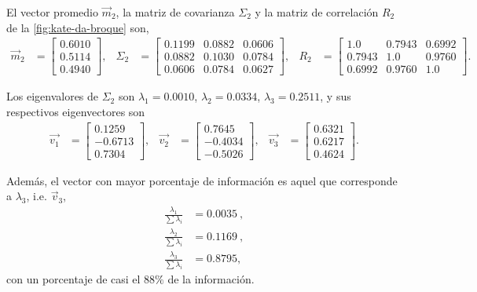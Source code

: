 El vector promedio $\vec{m}_2$, la matriz de covarianza $\Sigma_2$ y la matriz de correlación $R_2$ de la \cref{fig:kate-da-broque} son,
\begin{align*}
    \vec{m}_2 & =
    \begin{bmatrix}
        0.6010 \\
        0.5114 \\
        0.4940
    \end{bmatrix}, &
    \Sigma_2 & =
    \begin{bmatrix}
        0.1199 & 0.0882 & 0.0606 \\
        0.0882 & 0.1030 & 0.0784 \\
        0.0606 & 0.0784 & 0.0627
    \end{bmatrix}, &
    R_2 & = 
    \begin{bmatrix}
        1.0    & 0.7943 & 0.6992 \\
        0.7943 & 1.0    & 0.9760 \\
        0.6992 & 0.9760 & 1.0
    \end{bmatrix}.
\end{align*}

Los eigenvalores de $\Sigma_2$ son $\lambda_1 = 0.0010$, $\lambda_2 = 0.0334$, $\lambda_3 = 0.2511$, y sus respectivos eigenvectores son
\begin{align*}
    \vec{v_1} & =
    \begin{bmatrix}
        0.1259 \\
        -0.6713 \\
        0.7304
    \end{bmatrix}, &
    \vec{v_2} & = 
    \begin{bmatrix}
        0.7645 \\
        -0.4034 \\
        -0.5026
    \end{bmatrix}, &
    \vec{v_3} & =
    \begin{bmatrix}
        0.6321 \\
        0.6217 \\
        0.4624
    \end{bmatrix}.
\end{align*}

Además, el vector con mayor porcentaje de información es aquel que corresponde a $\lambda_3$, i.e. $\vec{v}_3$,
\begin{align*}
    \frac{\lambda_1}{\sum \lambda_i} & = 0.0035\ , \\
    \frac{\lambda_2}{\sum \lambda_i} & = 0.1169\ , \\
    \frac{\lambda_3}{\sum \lambda_i} & = 0.8795 ,
\end{align*}
con un porcentaje de casi el $88\%$ de la información.

